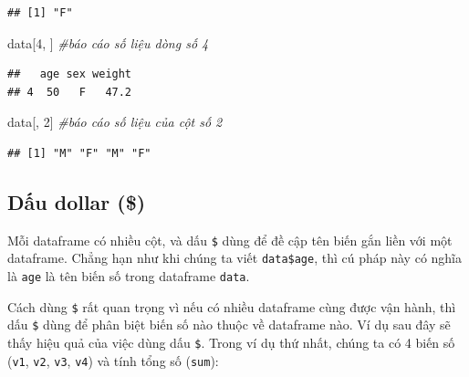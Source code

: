 \documentclass[
]{book}
\newenvironment{Shaded}{\begin{snugshade}}{\end{snugshade}}
\newcommand{\CommentTok}[1]{\textcolor[rgb]{0.56,0.35,0.01}{\textit{#1}}}
\newcommand{\DecValTok}[1]{\textcolor[rgb]{0.00,0.00,0.81}{#1}}
\newcommand{\NormalTok}[1]{#1}
\begin{document}
\begin{verbatim}
## [1] "F"
\end{verbatim}

\begin{Shaded}
\begin{Highlighting}[]
\NormalTok{data[}\DecValTok{4}\NormalTok{, ] }\CommentTok{\#báo cáo số liệu dòng số 4}
\end{Highlighting}
\end{Shaded}

\begin{verbatim}
##   age sex weight
## 4  50   F   47.2
\end{verbatim}

\begin{Shaded}
\begin{Highlighting}[]
\NormalTok{data[, }\DecValTok{2}\NormalTok{] }\CommentTok{\#báo cáo số liệu của cột số 2}
\end{Highlighting}
\end{Shaded}

\begin{verbatim}
## [1] "M" "F" "M" "F"
\end{verbatim}

\hypertarget{dux1ea5u-dollar}{%
\subsection*{Dấu dollar (\$)}\label{dux1ea5u-dollar}}

Mỗi dataframe có nhiều cột, và dấu \texttt{\$} dùng để đề cập tên biến gắn liền với một dataframe. Chẳng hạn như khi chúng ta viết \texttt{data\$age}, thì cú pháp này có nghĩa là \texttt{age} là tên biến số trong dataframe \texttt{data}.

Cách dùng \texttt{\$} rất quan trọng vì nếu có nhiều dataframe cùng được vận hành, thì dấu \texttt{\$} dùng để phân biệt biến số nào thuộc về dataframe nào. Ví dụ sau đây sẽ thấy hiệu quả của việc dùng dấu \texttt{\$}. Trong ví dụ thứ nhất, chúng ta có 4 biến số (\texttt{v1}, \texttt{v2}, \texttt{v3}, \texttt{v4}) và tính tổng số (\texttt{sum}):
\end{document}
